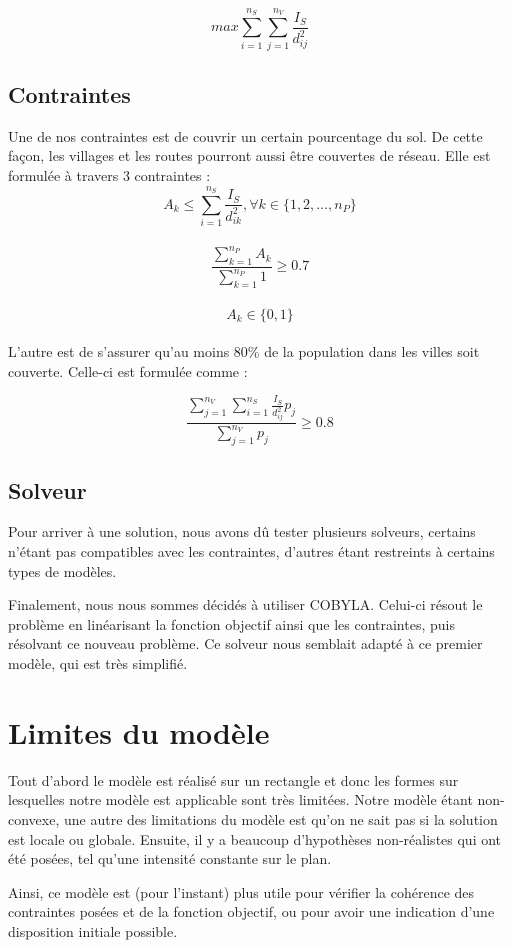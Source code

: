 \documentclass[a4paper]{article}
\begin{document}
$$max \sum_{i=1}^{n_S} \sum_{j=1}^{n_V} \frac{I_S}{d_{ij}^2}  $$


\subsection{Contraintes}
Une de nos contraintes est de couvrir un certain pourcentage du sol. De cette façon, les villages et les routes pourront aussi être couvertes de réseau. Elle est formulée à travers 3 contraintes :
$$ A_k \leq \sum_{i=1}^{n_S} \frac{I_S}{d_{ik}^2} , \forall k \in \{1,2,\ldots, n_P\}$$
\\
$$ \frac{\sum_{k=1}^{n_P} A_k}{\sum_{k=1}^{n_P} 1} \geq 0.7$$ 
\\
$$ A_k \in \{0,1\}$$
\\
L'autre est de s'assurer qu'au moins 80\% de la population dans les villes soit couverte. Celle-ci est formulée comme :

$$ \frac{\sum_{j=1}^{n_V} \sum_{i=1}^{n_S} \frac{I_S}{d_{ij}^2} p_j}{\sum_{j=1}^{n_V} p_j} \geq 0.8 $$

\subsection{Solveur}
Pour arriver à une solution, nous avons dû tester plusieurs solveurs, certains n'étant pas compatibles avec les contraintes, d'autres étant restreints à certains types de modèles.

Finalement, nous nous sommes décidés à utiliser COBYLA. Celui-ci résout le problème en linéarisant la fonction objectif ainsi que les contraintes, puis résolvant ce nouveau problème.
Ce solveur nous semblait adapté à ce premier modèle, qui est très simplifié.
\section{Limites du modèle}
Tout d'abord le modèle est réalisé sur un rectangle et donc les formes sur lesquelles notre modèle est applicable sont très limitées. 
Notre modèle étant non-convexe, une autre des limitations du modèle est qu'on ne sait pas si la solution est locale ou globale. 
Ensuite, il y a beaucoup d'hypothèses non-réalistes qui ont été posées, tel qu'une intensité constante sur le plan. 

Ainsi, ce modèle est (pour l'instant) plus utile pour vérifier la cohérence des contraintes posées et de la fonction objectif, ou pour avoir une indication d'une disposition initiale possible.
\end{document}
